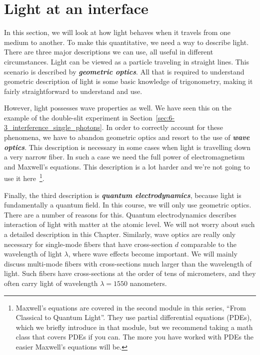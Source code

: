 \section{Light at an interface}
\label{sec:7-2_light_at_interface}

In this section, we will look at how light behaves when it travels from one medium to another.
To make this quantitative, we need a way to describe light. 
There are three major descriptions we can use, all useful in different circumstances.
Light can be viewed as a particle traveling in straight lines.
This scenario is described by \textbf{\emph{geometric optics}}.
All that is required to understand geometric description of light is some basic knowledge of trigonometry, making it fairly straightforward to understand and use.

However, light possesses wave properties as well.
We have seen this on the example of the double-slit experiment in Section~\ref{sec:6-3_interference_single_photons}. 
In order to correctly account for these phenomena, we have to abandon geometric optics and resort to the use of \textit{\textbf{wave optics}}.
This description is necessary in some cases when light is travelling down a very narrow fiber.
In such a case we need the full power of electromagnetism and Maxwell's equations.
This description is a lot harder and we're not going to use it here~\footnote{Maxwell's equations are covered in the second module in this series, ``From Classical to Quantum Light''.  They use partial differential equations (PDEs), which we briefly introduce in that module, but we recommend taking a math class that covers PDEs if you can. The more you have worked with PDEs the easier Maxwell's equations will be.}.

Finally, the third description is \textit{\textbf{quantum electrodynamics}}, because light is fundamentally a quantum field.
In this course, we will only use geometric optics.
There are a number of reasons for this.
Quantum electrodynamics describes interaction of light with matter at the atomic level.
We will not worry about such a detailed description in this Chapter.
Similarly, wave optics are really only necessary for single-mode fibers that have cross-section $d$ comparable to the wavelength of light $\lambda$, where wave effects become important.
We will mainly discuss multi-mode fibers with cross-sections much larger than the wavelength of light.
Such fibers have cross-sections at the order of tens of micrometers, and
they often carry light of wavelength $\lambda=1550$ nanometers.

